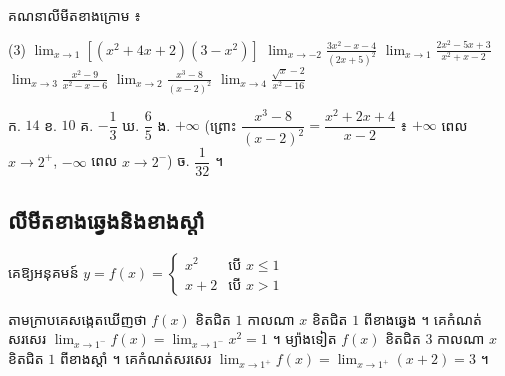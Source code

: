 \begin{pro}
គណនាលីមីតខាងក្រោម ៖
\begin{tasks}(3)
  \task $\displaystyle\lim_{x \to 1}[(x^2 + 4x + 2)(3 - x^2)]$
  \task $\displaystyle\lim_{x \to -2}\frac{3x^2 - x - 4}{(2x + 5)^2}$
  \task $\displaystyle\lim_{x \to 1}\frac{2x^2 - 5x + 3}{x^2 + x - 2}$
  \task $\displaystyle\lim_{x \to 3}\frac{x^2 - 9}{x^2 - x - 6}$
  \task $\displaystyle\lim_{x \to 2}\frac{x^3 - 8}{(x - 2)^2}$
  \task $\displaystyle\lim_{x \to 4}\frac{\sqrt{x} - 2}{x^2 - 16}$
\end{tasks}
\ans
ក. $14$ \quad ខ. $10$ \quad គ. $-\dfrac{1}{3}$ \quad ឃ. $\dfrac{6}{5}$ \quad ង. $+\infty$ (ព្រោះ $\dfrac{x^3 - 8}{(x - 2)^2} = \dfrac{x^2 + 2x + 4}{x - 2}$ ៖ $+\infty$ ពេល $x \to 2^+$, $-\infty$ ពេល $x \to 2^-$) \quad ច. $\dfrac{1}{32}$ ។
\end{pro}

\subsection{លីមីតខាងឆ្វេងនិងខាងស្ដាំ}

\begin{example}[ឧទាហរណ៍]
គេឱ្យអនុគមន៍ $y = f(x) = \begin{cases} x^2 & \text{បើ } x \le 1\\ x + 2 & \text{បើ } x > 1 \end{cases}$
\end{example}

\begin{center}
\end{center}

តាមក្រាបគេសង្កេតឃើញថា $f(x)$ ខិតជិត $1$ កាលណា $x$ ខិតជិត $1$ ពីខាងឆ្វេង ។ គេកំណត់សរសេរ $\displaystyle\lim_{x \to 1^-} f(x) = \lim_{x \to 1^-} x^2 = 1$ ។ ម្យ៉ាងទៀត $f(x)$ ខិតជិត $3$ កាលណា $x$ ខិតជិត $1$ ពីខាងស្ដាំ ។ គេកំណត់សរសេរ $\displaystyle\lim_{x \to 1^+} f(x) = \lim_{x \to 1^+}(x + 2) = 3$ ។

